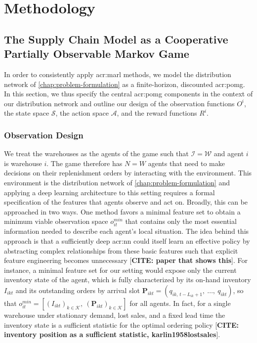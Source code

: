 \chapter{Methodology}


\section{The Supply Chain Model as a Cooperative Partially Observable Markov Game}
\label{sec:supply-chain-pomg}
In order to consistently apply \gls{acr:marl} methods, we model the distribution network of \autoref{chap:problem-formulation} as a finite-horizon, discounted \gls{acr:pomg}. In this section, we thus specify the central \gls{acr:pomg} components in the context of our distribution network and outline our design of the observation functions $O^i$, the state space $\mathcal{S}$, the action space $\mathcal{A}$, and the reward functions $R^i$.\\   

\subsection{Observation Design}
\label{subsec:observation-design}
We treat the warehouses as the agents of the game such that $\mathcal{I}=\mathcal{W}$ and agent $i$ is warehouse $i$. The game therefore has $N=W$ agents that need to make decisions on their replenishment orders by interacting with the environment. This environment is the distribution network of \autoref{chap:problem-formulation} and applying a deep learning architecture to this setting requires a formal specification of the features that agents observe and act on. Broadly, this can be approached in two ways. 
One method favors a minimal feature set to obtain a minimum viable observation space $o_{it}^{min}$ that contains only the most essential information needed to describe each agent's local situation. The idea behind this approach is that a sufficiently deep \gls{acr:nn} could itself learn an effective policy by abstracting complex relationships from these basic features such that explicit feature engineering becomes unnecessary [\textbf{CITE: paper that shows this}].
For instance, a minimal feature set for our setting would expose only the current inventory state of the agent, which is fully characterized by its on-hand inventory $I_{ikt}$ and its outstanding orders by arrival slot $\mathbf{P}_{ikt} = \left( q_{ik,\,t-L_{ik}+1},\ \dots,\ q_{ikt} \right)$, so that $ o_{it}^{min} = [ (I_{ikt})_{k \in \mathcal{K}},\ (\mathbf{P}_{ikt})_{k \in \mathcal{K}} ]$ for all agents. In fact, for a single warehouse under stationary demand, lost sales, and a fixed lead time the inventory state is a sufficient statistic for the optimal ordering policy [\textbf{CITE: inventory position as a sufficient statistic, {karlin1958lostsales}}].

